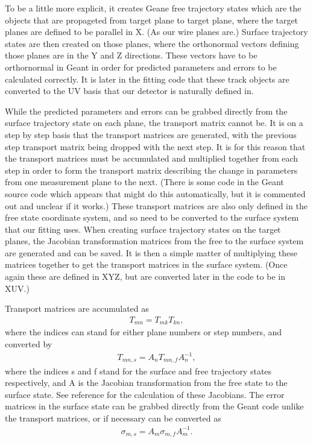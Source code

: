 \begin{enumerate}
\begin{itemize}
          To be a little more explicit, it creates Geane free trajectory states which are the objects that are propageted from target plane to target plane, where the target planes are defined to be parallel in X. (As our wire planes are.) Surface trajectory states are then created on those planes, where the orthonormal vectors defining those planes are in the Y and Z directions. These vectors have to be orthornormal in Geant in order for predicted parameters and errors to be calculated correctly. It is later in the fitting code that these track objects are converted to the UV basis that our detector is naturally defined in. 
            
          While the predicted parameters and errors can be grabbed directly from the surface trajectory state on each plane, the transport matrix cannot be. It is on a step by step basis that the transport matrices are generated, with the previous step transport matrix being dropped with the next step. It is for this reason that the transport matrices must be accumulated and multiplied together from each step in order to form the transport matrix describing the change in parameters from one measurement plane to the next. (There is some code in the Geant source code which appears that might do this automatically, but it is commented out and unclear if it works.) These transport matrices are also only defined in the free state coordinate system, and so need to be converted to the surface system that our fitting uses. When creating surface trajectory states on the target planes, the Jacobian transformation matrices from the free to the surface system are generated and can be saved. It is then a simple matter of multiplying these matrices together to get the transport matrices in the surface system. (Once again these are defined in XYZ, but are converted later in the code to be in XUV.)

          Transport matrices are accumulated as
              \begin{align} %
                T_{mn} = T_{mk}T_{kn},
              \end{align}
          where the indices can stand for either plane numbers or step numbers, and converted by 
              \begin{align} %
                T_{mn,s} = A_{n} T_{mn,f} A_{n}^{-1},
              \end{align}     
          where the indices s and f stand for the surface and free trajectory states respectively, and A is the Jacobian transformation from the free state to the surface state. See reference \cite{jacob} for the calculation of these Jacobians. The error matrices in the surface state can be grabbed directly from the Geant code unlike the transport matrices, or if necessary can be converted as
              \begin{align} %
                \sigma_{m,s} = A_{m} \sigma_{m,f} A_{m}^{-1}.
              \end{align}   


\end{itemize}
\end{enumerate}

